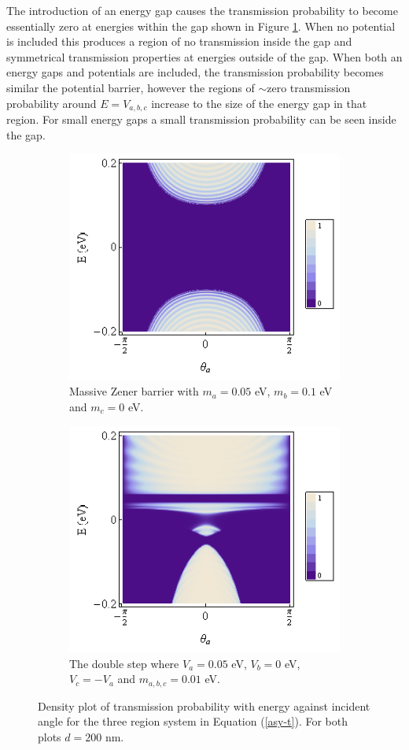 		The introduction of an energy gap causes the transmission probability to become essentially zero at energies within the gap shown in Figure \ref{asy-1}. When no potential is included this produces a region of no transmission inside the gap and symmetrical transmission properties at energies outside of the gap. When both an energy gaps and potentials are included, the transmission probability becomes similar the potential barrier, however the regions of $\sim$zero transmission probability around $E=V_{a,b,c}$ increase to the size of the energy gap in that region. For small energy gaps a small transmission probability can be seen inside the gap.
		\begin{figure}[h]
			 \begin{subfigure}[h]{0.5\textwidth}
				\centerline{\includegraphics[scale=0.5]{images/asy-1}}
				\caption{Massive Zener barrier with $m_{a}=0.05$ eV, $m_{b}=0.1$ eV and $m_{c}=0$ eV.}
			\end{subfigure}
			\hspace{0.5cm}
			\begin{subfigure}[h]{0.5\textwidth}
				\centerline{\includegraphics[scale=0.5]{images/asy-2}}
				\caption{The double step where $V_{a}=0.05$ eV, $V_{b}=0$ eV, $V_{c}=-V_{a}$ and $m_{a,b,c}=0.01$ eV.}
			\end{subfigure}
			\caption{Density plot of transmission probability with energy against incident angle for the three region system in Equation (\ref{asy-t}). For both plots $d=200$ nm.}
			\label{asy-1}
		\end{figure}
